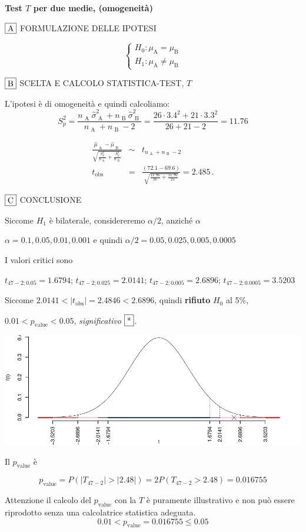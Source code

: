 \documentclass[
  11pt,
]{book}
\theoremstyle{mytheoremstyle}
\theoremstyle{mydefstyle}
\newenvironment{sol}
  {
  \begin{tcolorbox}[enhanced,breakable,arc=0.1mm,boxrule=1pt,colback=white,colframe=iblue,
  title=\bf \fontfamily{lmss}\selectfont \hspace{.5 cm} Soluzione,drop fuzzy shadow]

}{
\end{tcolorbox}
  }
\begin{document}
\begin{sol}
\textbf{Test \(T\) per due medie, (omogeneità)}

\(\fbox{A}\) FORMULAZIONE DELLE IPOTESI

\[\begin{cases}
   H_0: \mu_\text{A} = \mu_\text{B} \\
   H_1: \mu_\text{A} \neq \mu_\text{B} 
   \end{cases}\]

\(\fbox{B}\) SCELTA E CALCOLO STATISTICA-TEST, \(T\)

L'ipotesi è di omogeneità e quindi calcoliamo:\[
   S_p^2=\frac{n_\text{ A }\hat\sigma^2_\text{ A }+n_\text{ B }\hat\sigma^2_\text{ B }}{n_\text{ A }+n_\text{ B }-2} =
   \frac{ 26 \cdot 3.4 ^2+ 21 \cdot 3.3 ^2}{ 26 + 21 -2}= 11.76 
  \]

\begin{eqnarray*}
  \frac{\hat\mu_\text{ A } - \hat\mu_\text{ B }}
  {\sqrt{\frac {S^2_p}{n_\text{ A }}+\frac {S^2_p}{n_\text{ B }}}}&\sim&t_{n_\text{ A }+n_\text{ B }-2}\\
  t_{\text{obs}}
  &=& \frac{ ( 72.1 -  69.6 )} {\sqrt{\frac{ 11.76 }{ 26 }+\frac{ 11.76 }{ 21 }}}
  =   2.485 \, .
  \end{eqnarray*}

\(\fbox{C}\) CONCLUSIONE

Siccome \(H_1\) è bilaterale, considereremo \(\alpha/2\),
anziché \(\alpha\)

\(\alpha=0.1, 0.05, 0.01, 0.001\) e quindi \(\alpha/2=0.05, 0.025, 0.005, 0.0005\)

I valori critici sono

\(t_{47-2;0.05}=1.6794\); \(t_{47-2;0.025}=2.0141\); \(t_{47-2;0.005}=2.6896\); \(t_{47-2;0.0005}=3.5203\)

Siccome \(2.0141<|t_\text{obs}|=2.4846<2.6896\), quindi \textbf{rifiuto} \(H_0\) al 5\%,

\(0.01<p_\text{value}<0.05\), \emph{significativo} \(\fbox{*}\).

\begin{center}\includegraphics{Esami_passati_con_soluzioni_files/figure-latex/unnamed-chunk-66-1} \end{center}

Il \(p_{\text{value}}\) è

\[ p_{\text{value}} = P(|T_{47-2}|>|2.48|)=2P(T_{47-2}>2.48)=0.016755 \]

Attenzione il calcolo del \(p_\text{value}\) con la \(T\) è puramente illustrativo e non può essere riprodotto senza una calcolatrice statistica adeguata.\[
 0.01 < p_\text{value}= 0.016755 \leq 0.05 
\]

\end{sol}
\end{document}
